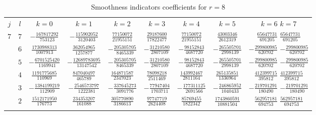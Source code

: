 \begin{table}
  \begin{center}
    \caption{Smoothness indicators coefficients for $r=8$}
    \label{tab:IS_8}
    \begin{tabular}{ccccccccc}
      \toprule
      $j$  &  $l$  &  $k=0$                            &  $k=1$                            &  $k=2$                            &  $k=3$                           &  $k=4$                            &  $k=5$                            &  $k=6$                          $k=7$                          \\ \addlinespace
      $7$  &  $7$  &  $-\frac{  167817292}{ 753123} $  &  $-\frac{  115902052}{ 3120403}$  &  $ \frac{   77150072}{21955151}$  &  $ \frac{  29187600}{17822477}$  &  $ \frac{   77150072}{21955151}$  &  $ \frac{  43003346}{ 2612319} $  &  $ \frac{  65647731}{ 691205}$  $ \frac{  65647731}{ 691205}$  \\ \addlinespace
           &  $6$  &  $ \frac{ 1730988313}{1007913} $  &  $ \frac{  362054965}{ 1257877}$  &  $-\frac{  205305705}{ 8465339}$  &  $-\frac{  31210580}{ 2807109}$  &  $-\frac{   98152843}{ 4687720}$  &  $-\frac{ 265505701}{ 2998139} $  &  $-\frac{ 299800985}{ 620702}$  $-\frac{ 299800985}{ 620702}$  \\ \addlinespace
           &  $5$  &  $-\frac{ 6701525420}{1169941} $  &  $-\frac{12689783695}{13147542}$  &  $-\frac{  205305705}{ 8465339}$  &  $-\frac{  31210580}{ 2807109}$  &  $-\frac{   98152843}{ 4687720}$  &  $-\frac{ 265505701}{ 2998139} $  &  $-\frac{ 299800985}{ 620702}$  $-\frac{ 299800985}{ 620702}$  \\ \addlinespace
           &  $4$  &  $ \frac{ 1191775685}{ 110969} $  &  $ \frac{  847040497}{  465789}$  &  $ \frac{  164871587}{ 2347023}$  &  $ \frac{  78098218}{ 2511469}$  &  $ \frac{  143992467}{ 2811164}$  &  $ \frac{ 265135851}{ 1336964} $  &  $ \frac{ 412399715}{ 395812}$  $ \frac{ 412399715}{ 395812}$  \\ \addlinespace
           &  $3$  &  $-\frac{ 1384199219}{ 112909} $  &  $-\frac{ 2546573797}{ 1222381}$  &  $-\frac{  337645273}{ 3091776}$  &  $-\frac{  77947404}{ 1703711}$  &  $-\frac{  177311125}{ 2691566}$  &  $-\frac{ 246865952}{ 1040433} $  &  $-\frac{ 219701291}{ 180490}$  $-\frac{ 219701291}{ 180490}$  \\ \addlinespace
           &  $2$  &  $ \frac{ 1512171950}{ 176773} $  &  $ \frac{  234353207}{  161088}$  &  $ \frac{  305770890}{ 3186613}$  &  $ \frac{  97747719}{ 2624408}$  &  $ \frac{   85769455}{ 1822342}$  &  $ \frac{1743860591}{10881504} $  &  $ \frac{ 562957181}{ 694753}$  $ \frac{ 562957181}{ 694753}$  \\ \addlinespace

\end{tabular}
\end{center}
\end{table}
